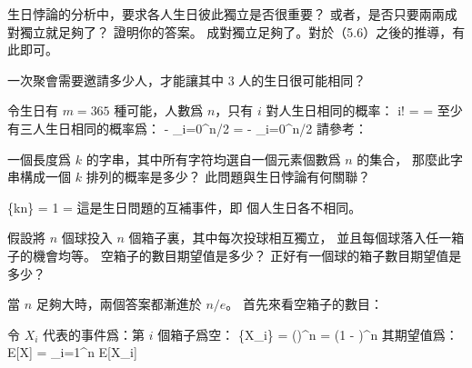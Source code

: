 \startEXERCISE \DIFFICULT
生日悖論的分析中，要求各人生日彼此獨立是否很重要？
或者，是否只要兩兩成對獨立就足夠了？
證明你的答案。
\stopEXERCISE
\startANSWER
成對獨立足夠了。對於（5.6）之後的推導，有此即可。
\stopANSWER

\startEXERCISE \DIFFICULT
一次聚會需要邀請多少人，才能讓其中 3 人的生日很可能相同？
\stopEXERCISE

\startANSWER
令生日有 $m=365$ 種可能，人數爲 $n$，只有 $i$ 對人生日相同的概率：
\startformula\startmathalignment
\NC \NC
{}
     {i!} \NR
\NC \NC \qquad {}  \cdots {} \NR
\NC = \NC {}
           \NR
\NC = \NC {} \NR
\stopmathalignment\stopformula
至少有三人生日相同的概率爲：
\startformula\startmathalignment
\NC {} - \sum_{i=0}^{\lfloor n/2\rfloor} \NR
\NC =  - \sum_{i=0}^{\lfloor n/2\rfloor}
               \NR
\stopmathalignment\stopformula
請參考：
\stopANSWER

\startEXERCISE \DIFFICULT
一個長度爲 $k$ 的字串，其中所有字符均選自一個元素個數爲 $n$ 的集合，
那麼此字串構成一個 $k$ 排列的概率是多少？
此問題與生日悖論有何關聯？
\stopEXERCISE

\startANSWER
\startformula
\Pr\{kn\} = 1 \cdot
                                  \cdot
                                  \cdots
      = 
\stopformula
這是生日問題的互補事件，即  個人生日各不相同。
\stopANSWER

\startEXERCISE \DIFFICULT
假設將 $n$ 個球投入 $n$ 個箱子裏，其中每次投球相互獨立，
並且每個球落入任一箱子的機會均等。
空箱子的數目期望值是多少？
正好有一個球的箱子數目期望值是多少？
\stopEXERCISE

\startANSWER
當 $n$ 足夠大時，兩個答案都漸進於 $n/e$。
首先來看空箱子的數目：

令 $X_i$ 代表的事件爲：第 $i$ 個箱子爲空：
\startformula
\Pr\{X_i\} = \left(\right)^n
                = \left(1 - \right)^n
                \approx {}
\stopformula
其期望值爲：
\startformula
E[X] = \sum_{i=1}^n E[X_i] \approx {}
\stopformula

